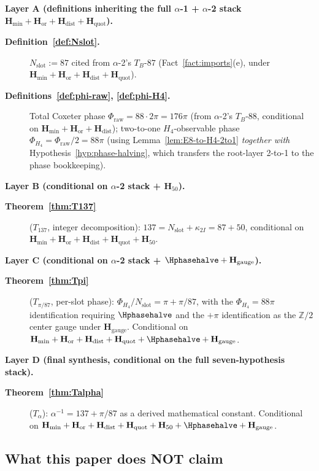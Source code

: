 \documentclass[11pt, a4paper]{amsart}
\theoremstyle{definition}
\newcommand{\Z}{\mathbb{Z}}
\newcommand{\Hmin}{\mathbf{H}_{\min}}
\newcommand{\Hor}{\mathbf{H}_{\mathrm{or}}}
\newcommand{\Hdist}{\mathbf{H}_{\mathrm{dist}}}
\newcommand{\Hquot}{\mathbf{H}_{\mathrm{quot}}}
\newcommand{\Hfifty}{\mathbf{H}_{50}}
\newcommand{\Hgauge}{\mathbf{H}_{\mathrm{gauge}}}
\newcommand{\Nslot}{N_{\mathrm{slot}}}
\newcommand{\kappaTwoI}{\kappa_{2I}}
\newcommand{\Phiraw}{\Phi_{\mathrm{raw}}}
\newcommand{\PhiHfour}{\Phi_{H_4}}
\begin{document}
\textbf{Layer A (definitions inheriting the full $\alpha$-1
+ $\alpha$-2 stack $\Hmin + \Hor + \Hdist + \Hquot$).}
\begin{description}
\item[\textbf{Definition~\ref{def:Nslot}.}] $\Nslot := 87$
  cited from $\alpha$-2's $T_B$-$87$
  (Fact~\ref{fact:imports}(e), under
  $\Hmin + \Hor + \Hdist + \Hquot$).
\item[\textbf{Definitions~\ref{def:phi-raw}, \ref{def:phi-H4}.}]
  Total Coxeter phase $\Phiraw = 88 \cdot 2\pi = 176\pi$
  (from $\alpha$-2's $T_B$-$88$, conditional on
  $\Hmin + \Hor + \Hdist$); two-to-one $H_4$-observable
  phase $\PhiHfour = \Phiraw / 2 = 88\pi$ (using
  Lemma~\ref{lem:E8-to-H4-2to1} \emph{together with}
  Hypothesis~\ref{hyp:phase-halving}, which transfers the
  root-layer 2-to-1 to the phase bookkeeping).
\end{description}

\textbf{Layer B (conditional on $\alpha$-2 stack + $\Hfifty$).}
\begin{description}
\item[\textbf{Theorem~\ref{thm:T137}}] (\textbf{$T_{137}$},
  integer decomposition): $137 = \Nslot + \kappaTwoI = 87
  + 50$, conditional on $\Hmin + \Hor + \Hdist + \Hquot +
  \Hfifty$.
\end{description}

\textbf{Layer C (conditional on $\alpha$-2 stack + $\Hphasehalve + \Hgauge$).}
\begin{description}
\item[\textbf{Theorem~\ref{thm:Tpi}}] (\textbf{$T_{\pi/87}$},
  per-slot phase): $\PhiHfour / \Nslot = \pi + \pi/87$,
  with the $\PhiHfour = 88\pi$ identification requiring
  $\Hphasehalve$ and the $+\pi$ identification as the $\Z/2$
  center gauge under $\Hgauge$. Conditional on
  $\Hmin + \Hor + \Hdist + \Hquot + \Hphasehalve + \Hgauge$.
\end{description}

\textbf{Layer D (final synthesis, conditional on the full
seven-hypothesis stack).}
\begin{description}
\item[\textbf{Theorem~\ref{thm:Talpha}}] (\textbf{$T_\alpha$}):
  $\alpha^{-1} = 137 + \pi/87$ as a derived mathematical
  constant. Conditional on $\Hmin + \Hor + \Hdist + \Hquot
  + \Hfifty + \Hphasehalve + \Hgauge$.
\end{description}

\subsection{What this paper does NOT claim}
\end{document}
